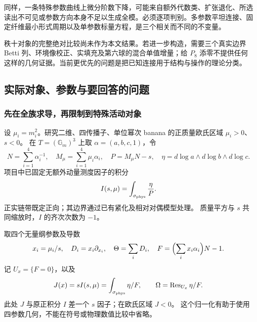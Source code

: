 \documentclass[11pt,a4paper,oneside]{ctexart}
\theoremstyle{cnplain}
\theoremstyle{definition}
\theoremstyle{remark}
\newcommand{\Q}{\mathbb Q}
\newcommand{\C}{\mathbb C}
\newcommand{\Gr}{\operatorname{Gr}}
\newcommand{\Res}{\operatorname{Res}}
\newcommand{\dR}{\mathrm{dR}}
\numberwithin{equation}{section}
\begin{document}
同样，一条特殊参数曲线上微分阶数下降，可能来自额外代数类、扩张退化、所选读出不可见或参数方向本身不足以生成全模。必须逐项判别。多参数平坦连接、固定纤维最小形式周期以及单参数标量方程，是三个相关而不同的不变量。

秩十对象的完整绝对比较尚未作为本文结果。若进一步构造，需要三个真实边界 Betti 列、环境像校正、实填充及第六球的混合单值增量；给 $P_8$ 添零不提供任何这样的几何证据。当前更优先的问题是把已知连接用于结构与操作的理论分类。




\endgroup



\begingroup
\providecommand{\Q}{\mathbb Q}
\providecommand{\C}{\mathbb C}
\providecommand{\dR}{\mathrm{dR}}
\providecommand{\Ann}{\operatorname{Ann}}
\providecommand{\Gr}{\operatorname{Gr}}
\providecommand{\Res}{\operatorname{Res}}
\providecommand{\rk}{\operatorname{rk}}
\providecommand{\cE}{\mathcal E}
\providecommand{\cM}{\mathcal M}
\subsection{实际对象、参数与要回答的问题}
\subsubsection{先在全族求导，再限制到特殊活动对象}
设 $\mu_i=m_i^2$。研究二维、四传播子、单位幂次 banana 的正质量欧氏区域 $\mu_i>0$、$s<0$。
在 $T=(\mathbb G_m)^3$ 上取 $\alpha=(a,b,c,1)$，令
\begin{equation}\label{deriv:eq:raw}
 N=\sum_{i=1}^4\alpha_i^{-1},\quad M_\mu=\sum_{i=1}^4\mu_i\alpha_i,
 \quad P=M_\mu N-s,\quad
 \eta=d\log a\wedge d\log b\wedge d\log c.
\end{equation}
项目中已固定无额外动量测度因子的积分
\begin{equation}\label{deriv:eq:I}
 I(s,\mu)=\int_{\sigma_{\rm phys}}\frac{\eta}{P}.
\end{equation}
正实链带既定正向；其边界通过已有紧化及相对对偶模型处理。
质量平方与 $s$ 共同缩放时，$I$ 的齐次次数为 $-1$。

取四个无量纲参数及导数
\begin{equation}\label{deriv:eq:dimensionless}
 x_i=\mu_i/s,\quad D_i=x_i\partial_{x_i},\quad
 \Theta=\sum_iD_i,\quad
 F=\Bigl(\sum_i x_i\alpha_i\Bigr)N-1.
\end{equation}
记 $U_x=\{F=0\}$，以及
\begin{equation}\label{deriv:eq:J}
 J(x)=sI(s,\mu)=\int_{\sigma_{\rm phys}}\eta/F,\qquad
 \Omega=\Res_{U_x}\eta/F.
\end{equation}
此处 $J$ 与原正积分 $I$ 差一个 $s$ 因子；在欧氏区域 $J<0$。
这个归一化有助于使用四参数几何，不能在符号或物理数值比较中省略。
\end{document}
